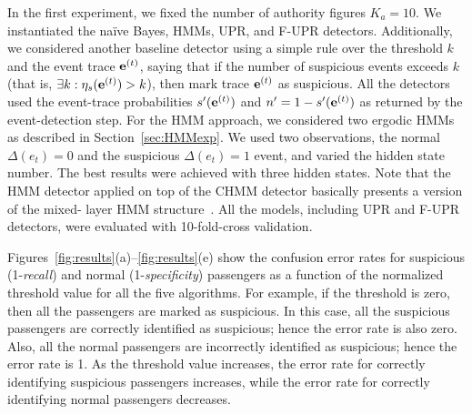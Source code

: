 In the first experiment, we fixed the number of authority figures $K_a=10$. We instantiated the na{\"i}ve Bayes, HMMs, UPR, and F-UPR detectors. Additionally, we considered another baseline detector using a simple rule over the threshold $k$ and the event trace $\mathbf{e}^{\scriptsize(t)}$, saying that if the number of suspicious events exceeds $k$ (that is, $\exists k: \eta_s(\mathbf{e}^{\scriptsize(t)}) > k$), then mark trace $\mathbf{e}^{\scriptsize(t)}$ as suspicious.
%
All the detectors used the event-trace probabilities $s'(\mathbf{e}^{\scriptsize(t)})$ and $n'=1-s'(\mathbf{e}^{\scriptsize(t)})$ as returned by the event-detection step. For the HMM approach, we considered two ergodic HMMs as described in Section~\ref{sec:HMMexp}. We used two observations, the normal $\Delta(e_t)=0$ and the suspicious $\Delta(e_t)=1$ event, and varied the hidden state number. The best results were achieved with three hidden states. Note that the HMM detector applied on top of the CHMM detector basically presents a version of the mixed- layer HMM structure~\citep{Fine1998, Nguyen2005, Duong2005}. All the models, including UPR and F-UPR detectors, were evaluated with 10-fold-cross validation. %

Figures~\ref{fig:results}(a)--\ref{fig:results}(e) show the confusion error rates for suspicious (1-\emph{recall}) and normal (1-\emph{specificity}) passengers as a function of the normalized threshold value for all the five algorithms. For example, if the threshold is zero, then all the passengers are marked as suspicious. In this case, all the suspicious passengers are correctly identified as suspicious; hence the error rate is also zero. Also, all the normal passengers are incorrectly identified as suspicious; hence the error rate is 1. As the threshold value increases, the error rate for correctly identifying suspicious passengers increases, while the error rate for correctly identifying normal passengers decreases.

